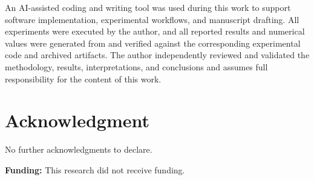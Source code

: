 \documentclass{ijimai_article}
\begin{document}
An AI-assisted coding and writing tool was used during this work to support software
implementation, experimental workflows, and manuscript drafting. All experiments were
executed by the author, and all reported results and numerical values were generated
from and verified against the corresponding experimental code and archived artifacts.
The author independently reviewed and validated the methodology, results,
interpretations, and conclusions and assumes full responsibility for the content of
this work.

\section{Acknowledgment}

No further acknowledgments to declare.

\textbf{Funding:} This research did not receive funding.



\end{document}
